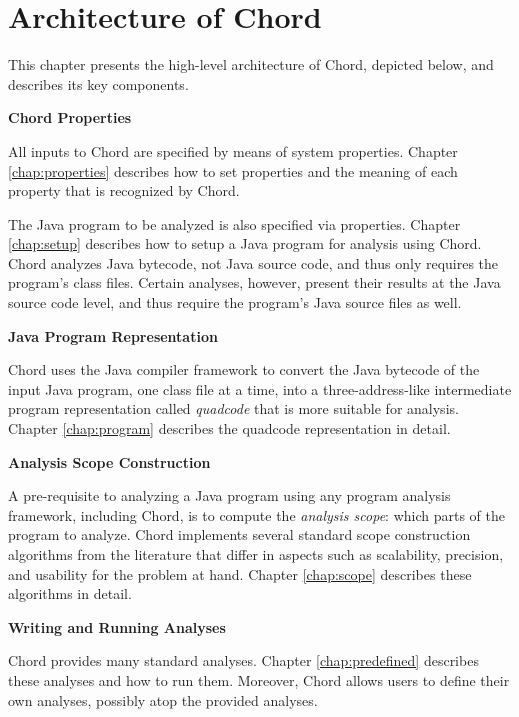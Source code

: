 \chapter{Architecture of Chord}
\label{chap:arch}

This chapter presents the high-level architecture of Chord, depicted below, and describes its key components.

\begin{center}
\end{center}

{\bf Chord Properties}

All inputs to Chord are specified by means of system properties.  Chapter
\ref{chap:properties} describes how to set properties and the meaning of each
property that is recognized by Chord.

The Java program to be analyzed is also specified via properties.  Chapter
\ref{chap:setup} describes how to setup a Java program for analysis using Chord.
Chord analyzes Java bytecode, not Java source code, and thus only requires the
program's class files.  Certain analyses, however, present their results at the
Java source code level, and thus require the program's Java source files as
well.

{\bf Java Program Representation}

Chord uses the  Java compiler
framework to convert the Java bytecode of the input Java program, one class file
at a time, into a three-address-like intermediate program representation called
{\it quadcode} that is more suitable for analysis. Chapter
\ref{chap:program} describes the quadcode representation in detail.

{\bf Analysis Scope Construction}

A pre-requisite to analyzing a Java program using any program analysis
framework, including Chord, is to compute the {\it analysis scope}: which parts
of the program to analyze.  Chord implements several standard scope construction
algorithms from the literature that differ in aspects such as scalability,
precision, and usability for the problem at hand.  Chapter \ref{chap:scope}
describes these algorithms in detail.

{\bf Writing and Running Analyses}

Chord provides many standard analyses.  Chapter \ref{chap:predefined} describes
these analyses and how to run them.  Moreover, Chord allows users to define
their own analyses, possibly atop the provided analyses.

